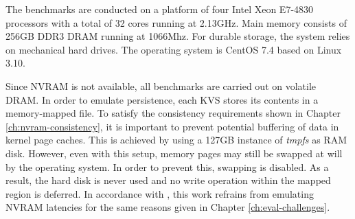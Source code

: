The benchmarks are conducted on a platform of four Intel Xeon E7-4830 processors
with a total of 32 cores running at 2.13GHz. Main memory consists of 256GB DDR3
\ac{DRAM} running at 1066Mhz. For durable storage, the system relies on
mechanical hard drives. The operating system is CentOS 7.4 based on Linux 3.10.

Since \ac{NVRAM} is not available, all benchmarks are carried out on volatile
\ac{DRAM}. In order to emulate persistence, each \ac{KVS} stores its contents in
a memory-mapped file. To satisfy the consistency requirements shown in Chapter
\ref{ch:nvram-consistency}, it is important to prevent potential buffering of
data in kernel page caches. This is achieved by using a 127GB instance of
\emph{tmpfs} as \ac{RAM} disk. However, even with this setup, memory pages may
still be swapped at will by the operating system. In order to prevent this,
swapping is disabled. As a result, the hard disk is never used and no write
operation within the mapped region is deferred. In accordance with
\cite{bailey2013exploring, zhou2016nvht}, this work refrains from emulating
\ac{NVRAM} latencies for the same reasons given in Chapter
\ref{ch:eval-challenges}.
